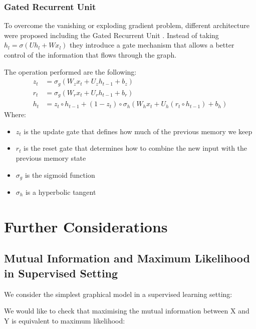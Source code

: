 \documentclass[10pt,oneside,openright]{report}
\begin{document}
\subsection{Gated Recurrent Unit}
To overcome the vanishing or exploding gradient problem, different architecture were proposed including the Gated Recurrent Unit \cite{gru}. Instead of taking $h_l = \sigma(U h_l + W x_l)$ they introduce a gate mechanism that allows a better control of the information that flows through the graph.

The operation performed are the following:
\begin{align}
z_t &= \sigma_g(W_{z} x_t + U_{z} h_{t-1} + b_z) \\
r_t &= \sigma_g(W_{r} x_t + U_{r} h_{t-1} + b_r) \\
h_t &=  z_t \circ h_{t-1} + (1-z_t) \circ \sigma_h(W_{h} x_t + U_{h} (r_t \circ h_{t-1}) + b_h)
\end{align}
Where:
\begin{itemize}
 \item $z_t$ is the update gate that defines how much of the previous memory we keep
 \item $r_t$ is the reset gate that determines how to combine the new input with the previous memory state
\item  $\sigma_g$ is the sigmoid function
\item $\sigma_h$ is a hyperbolic tangent
\end{itemize}
\chapter{Further Considerations}
\section{Mutual Information and Maximum Likelihood in Supervised Setting}

We consider the simplest graphical model in a supervised learning setting:

\begin{center}
\end{center}

We would like to check that maximising the mutual information between X and Y is equivalent to maximum likelihood:
\end{document}

